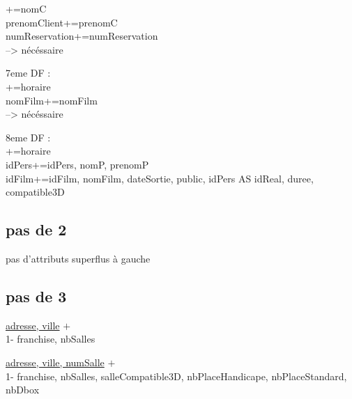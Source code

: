 \documentclass[a4paper,sffamily,12pt]{article}
\begin{document}
+={nomC} \\
{prenomClient}+={prenomC} \\
{numReservation}+={numReservation} \\
--> nécéssaire \\

\vspace{0.5cm}

\noindent7eme DF : \\

+={horaire} \\
{nomFilm}+={nomFilm} \\
--> nécéssaire

\vspace{0.5cm}

\noindent8eme DF : \\

+={horaire} \\
{idPers}+={idPers, nomP, prenomP} \\
{idFilm}+={idFilm, nomFilm, dateSortie, public, idPers AS idReal, duree, compatible3D} \\

\vspace{0.5cm}

\subsection{pas de 2}

pas d'attributs superflus à gauche

\vspace{0.5cm}

\subsection{pas de 3}

\vspace{0.5cm}

\underline{adresse, ville} $+$ \\
1- franchise, nbSalles\\

\vspace{0.5cm}

\underline{adresse, ville, numSalle} $+$ \\
1- franchise, nbSalles, salleCompatible3D, nbPlaceHandicape, nbPlaceStandard, nbDbox\\

\vspace{0.5cm}
\end{document}
